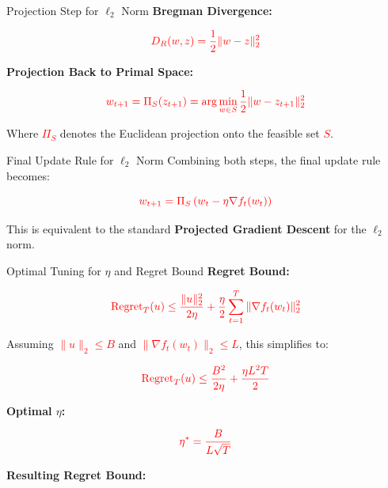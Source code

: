 \documentclass{beamer}
\begin{document}
\begin{small}
\begin{frame}{Projection Step for \(\ell_2\) Norm}
\textbf{Bregman Divergence:}

\begin{equation*}
\textcolor{red}{D_R(w, z) = \frac{1}{2} \|w - z\|_2^2}
\end{equation*}

\textbf{Projection Back to Primal Space:}

\begin{equation*}
\textcolor{red}{w_{t+1} = \Pi_S (z_{t+1}) = \arg\min_{w \in S} \frac{1}{2} \|w - z_{t+1}\|_2^2}
\end{equation*}

Where \textcolor{red}{$\Pi_S$} denotes the Euclidean projection onto the feasible set \textcolor{red}{$S$}.
\end{frame}

\begin{frame}{Final Update Rule for \(\ell_2\) Norm}
Combining both steps, the final update rule becomes:

\begin{equation*}
\textcolor{red}{w_{t+1} = \Pi_S \left( w_t - \eta \nabla f_t(w_t) \right)}
\end{equation*}

This is equivalent to the standard \textbf{Projected Gradient Descent} for the \(\ell_2\) norm.
\end{frame}
\begin{frame}{Optimal Tuning for \(\eta\) and Regret Bound}
\textbf{Regret Bound:}

\begin{equation*}
\textcolor{red}{\text{Regret}_T(u) \leq \frac{\|u\|_2^2}{2\eta} + \frac{\eta}{2} \sum_{t=1}^T \|\nabla f_t(w_t)\|_2^2}
\end{equation*}

Assuming \textcolor{red}{$\|u\|_2 \leq B$} and \textcolor{red}{$\|\nabla f_t(w_t)\|_2 \leq L$}, this simplifies to:

\begin{equation*}
\textcolor{red}{\text{Regret}_T(u) \leq \frac{B^2}{2\eta} + \frac{\eta L^2 T}{2}}
\end{equation*}

\textbf{Optimal \(\eta\):}

\begin{equation*}
\textcolor{red}{\eta^* = \frac{B}{L\sqrt{T}}}
\end{equation*}

\textbf{Resulting Regret Bound:}


\end{frame}
\end{small}
\end{document}

